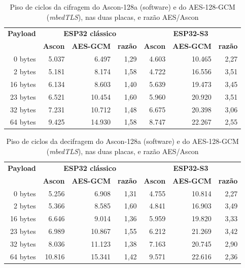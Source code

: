 \begin{table}[htb]
\centering
\caption{Piso de ciclos da cifragem do Ascon-128a (software) e do AES-128-GCM (\textit{mbedTLS}), nas duas placas, e razão AES/Ascon}
\label{tab:comparativo_aes}
\begin{tabular}{rrrrrrr}
\hline
\textbf{Payload} & \multicolumn{3}{c}{\textbf{ESP32 clássico}} & \multicolumn{3}{c}{\textbf{ESP32-S3}} \\
 & \textbf{Ascon} & \textbf{AES-GCM} & \textbf{razão} & \textbf{Ascon} & \textbf{AES-GCM} & \textbf{razão} \\
\hline
0 bytes  & 5.037 & 6.497  & 1,29 & 4.603 & 10.465 & 2,27 \\
2 bytes  & 5.181 & 8.174  & 1,58 & 4.722 & 16.556 & 3,51 \\
16 bytes & 6.134 & 8.603  & 1,40 & 5.639 & 19.473 & 3,45 \\
23 bytes & 6.521 & 10.454 & 1,60 & 5.960 & 20.920 & 3,51 \\
32 bytes & 7.231 & 10.712 & 1,48 & 6.675 & 20.398 & 3,06 \\
64 bytes & 9.425 & 14.930 & 1,58 & 8.747 & 22.267 & 2,55 \\
\hline
\end{tabular}
\end{table}

\begin{table}[htb]
\centering
\caption{Piso de ciclos da decifragem do Ascon-128a (software) e do AES-128-GCM (\textit{mbedTLS}), nas duas placas, e razão AES/Ascon}
\label{tab:comparativo_aes_dec}
\begin{tabular}{rrrrrrr}
\hline
\textbf{Payload} & \multicolumn{3}{c}{\textbf{ESP32 clássico}} & \multicolumn{3}{c}{\textbf{ESP32-S3}} \\
 & \textbf{Ascon} & \textbf{AES-GCM} & \textbf{razão} & \textbf{Ascon} & \textbf{AES-GCM} & \textbf{razão} \\
\hline
0 bytes  & 5.256  & 6.908  & 1,31 & 4.755 & 10.814 & 2,27 \\
2 bytes  & 5.366  & 8.585  & 1,60 & 4.841 & 16.903 & 3,49 \\
16 bytes & 6.646  & 9.014  & 1,36 & 5.959 & 19.820 & 3,33 \\
23 bytes & 6.989  & 10.867 & 1,55 & 6.212 & 21.269 & 3,42 \\
32 bytes & 8.036  & 11.123 & 1,38 & 7.163 & 20.745 & 2,90 \\
64 bytes & 10.816 & 15.341 & 1,42 & 9.571 & 22.616 & 2,36 \\
\hline
\end{tabular}
\end{table}

